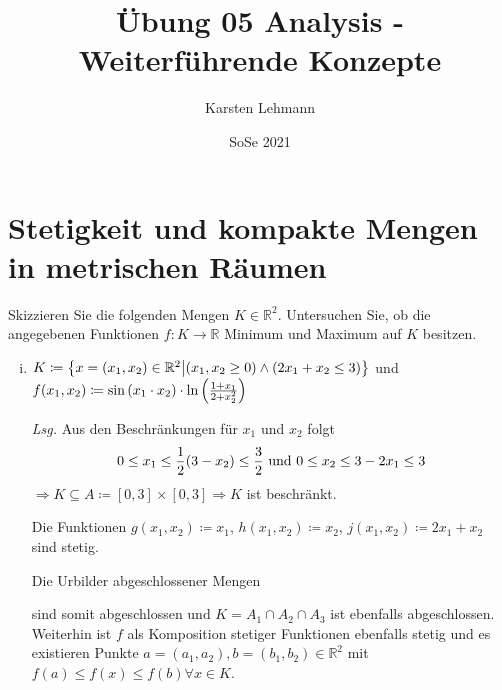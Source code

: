 \documentclass{scrreprt}
\author{Karsten Lehmann}
\date{SoSe 2021}
\title{Übung 05 Analysis - Weiterführende Konzepte}
\begin{document}
\section*{Stetigkeit und kompakte Mengen in metrischen Räumen}

Skizzieren Sie die folgenden Mengen $K \in \mathbb{R}^2$.
Untersuchen Sie, ob die angegebenen Funktionen $f: K \to \mathbb{R}$
Minimum und Maximum auf $K$ besitzen.
\begin{enumerate}[(i)]
\item $K \coloneqq \qty{x = \qty(x_1, x_2) \in \mathbb{R}^2 \middle|
    (x_1, x_2 \geq 0) \land (2x_1 + x_2 \leq 3)}$ und
  $f\qty(x_1, x_2) \coloneqq \sin\qty(x_1 \cdot x_2) \cdot
  \ln\qty(\frac{1 + x_1}{2 + x_2^2})$

  \textit{Lsg.} Aus den Beschränkungen für $x_1$ und $x_2$ folgt
  \[
    0 \leq x_1 \leq \frac{1}{2}\qty(3- x_2) \leq \frac{3}{2}
    \text{ und }
    0 \leq x_2 \leq 3 - 2x_1 \leq 3
  \]
  $\Rightarrow K \subseteq A \coloneqq [0, 3] \times [0, 3]
  \Rightarrow K$ ist beschränkt.

  \begin{center}
  \end{center}
  Die Funktionen $g(x_1, x_2) \coloneqq x_1$, $h(x_1, x_2) \coloneqq x_2$,
  $j(x_1, x_2) \coloneqq 2x_1 + x_2$ sind stetig.

  Die Urbilder abgeschlossener Mengen
  \begin{flalign*}
    A_1 &= g^{-1}([0, \infty)) = [0, \infty) \times {} & \\
    A_2 &= h^{-1}([0, \infty)) =  \times [0, \infty) \\
    A_3 &= j^{-1}((-\infty, 3]) = \qty{(x_1, x_2) \in \mathbb{R}^2 \middle|
      (x_1 \in \mathbb{R}) \land (x_2 \leq 3 - 2x_1)}
  \end{flalign*}
  sind somit abgeschlossen und
  $K = A_1 \cap A_2 \cap A_3$ ist ebenfalls abgeschlossen.
  Weiterhin ist $f$ als Komposition stetiger Funktionen ebenfalls stetig
  und es existieren Punkte $a = (a_1, a_2), b = (b_1, b_2) \in \mathbb{R}^2$
  mit $f(a) \leq f(x) \leq f(b) \forall x \in K$.


\end{enumerate}
\end{document}
